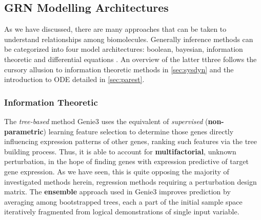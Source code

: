 \subsection{GRN Modelling Architectures}
\label{sec:models}
As we have discussed, there are many approaches that can be taken to understand relationships among biomolecules. Generally inference methods can be categorized into four model architectures: boolean, bayesian, information theoretic and differential equations \citep{HECKER200986,xiong2012gene,yaghoobi2012review}. An overview of the latter tthree follows the cursory allusion to information theoretic methods in \cref{sec:sysdyn} and the introduction to ODE detailed in \cref{sec:parest}.

\subsubsection{Information Theoretic}
\label{sec:info}
The \emph{tree-based} method Genie3 \citep{irrthum2010inferring} uses the equivalent of \emph{supervised} (\textbf{non-parametric}) learning feature selection to determine those genes directly influencing expression patterns of other genes, ranking such features via the tree building process. Thus, it is able to account for \textbf{multifactorial}, \ie unknown perturbation, in the hope of finding genes with expression predictive of target gene expression. As we have seen, this is quite opposing the majority of investigated methods herein, regression methods requiring a perturbation design matrix. The \textbf{ensemble} approach used in Genie3 improves prediction by averaging among bootstrapped trees, each a part of the initial sample space iteratively fragmented from logical demonstrations of single input variable.

